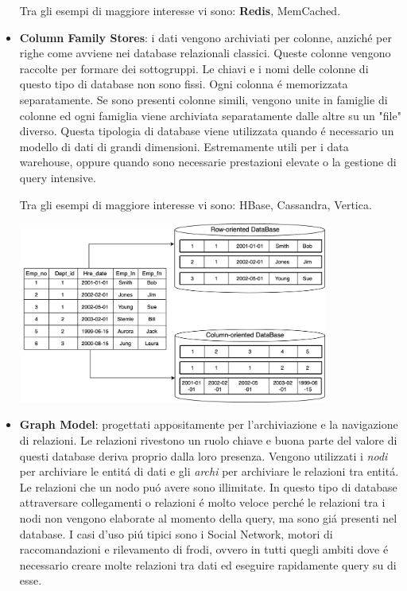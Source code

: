 \begin{itemize}
    Tra gli esempi di maggiore interesse vi sono: \textbf{Redis}, MemCached.
    \item \textbf{Column Family Stores}: i dati vengono archiviati per colonne, anziché per righe come avviene nei database relazionali classici.
    Queste colonne vengono raccolte per formare dei sottogruppi. Le chiavi e i nomi delle colonne di questo tipo di database non sono fissi.
    Ogni colonna é memorizzata separatamente. Se sono presenti colonne simili, vengono unite in famiglie di colonne ed ogni famiglia
    viene archiviata separatamente dalle altre su un "file" diverso.
    Questa tipologia di database viene utilizzata quando é necessario un modello di dati di grandi dimensioni. Estremamente utili
    per i data warehouse, oppure quando sono necessarie prestazioni elevate o la gestione di query intensive.

    Tra gli esempi di maggiore interesse vi sono: HBase, Cassandra, Vertica.

    \includegraphics[width=0.8\textwidth]{img/dbColumnOriented}

    \item \textbf{Graph Model}: progettati appositamente per l'archiviazione e la navigazione di relazioni. Le relazioni rivestono un ruolo chiave
    e buona parte del valore di questi database deriva proprio dalla loro presenza. Vengono utilizzati i \emph{nodi} per archiviare le entitá
    di dati e gli \emph{archi} per archiviare le relazioni tra entitá. Le relazioni che un nodo puó avere sono illimitate.
    In questo tipo di database attraversare collegamenti o relazioni é molto veloce perché le relazioni tra i nodi non vengono elaborate al momento
    della query, ma sono giá presenti nel database.
    I casi d'uso piú tipici sono i Social Network, motori di raccomandazioni e rilevamento di frodi, ovvero in tutti quegli ambiti dove é
    necessario creare molte relazioni tra dati ed eseguire rapidamente query su di esse.


\end{itemize}
